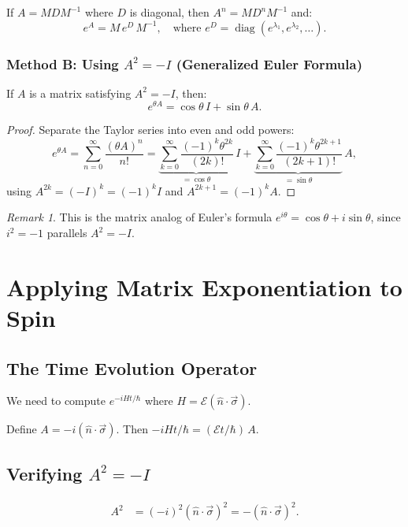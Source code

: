 \documentclass[11pt,a4paper]{article}
\theoremstyle{definition}
\theoremstyle{plain}
\theoremstyle{remark}
\newtheorem{remark}{Remark}[section]
\begin{document}
If $A = M D M^{-1}$ where $D$ is diagonal, then $A^n = MD^nM^{-1}$ and:
\[
    e^A = M\,e^D\,M^{-1}, \quad \text{where } e^D = \operatorname{diag}(e^{\lambda_1}, e^{\lambda_2}, \ldots).
\]

\subsubsection{Method B: Using $A^2 = -I$ (Generalized Euler Formula)}

If $A$ is a matrix satisfying $A^2 = -I$, then:
\[
    \boxed{e^{\theta A} = \cos\theta\, I + \sin\theta\, A.}
\]

\begin{proof}
    Separate the Taylor series into even and odd powers:
    \[
        e^{\theta A} = \sum_{n=0}^{\infty}\frac{(\theta A)^n}{n!} = \underbrace{\sum_{k=0}^{\infty}\frac{(-1)^k\theta^{2k}}{(2k)!}}_{=\cos\theta}\,I + \underbrace{\sum_{k=0}^{\infty}\frac{(-1)^k\theta^{2k+1}}{(2k+1)!}}_{=\sin\theta}\,A,
    \]
    using $A^{2k} = (-I)^k = (-1)^kI$ and $A^{2k+1} = (-1)^kA$. \qedhere
\end{proof}

\begin{remark}
    This is the matrix analog of Euler's formula $e^{i\theta} = \cos\theta + i\sin\theta$, since $i^2 = -1$ parallels $A^2 = -I$.
\end{remark}

\section{Applying Matrix Exponentiation to Spin}

\subsection{The Time Evolution Operator}

We need to compute $e^{-iHt/\hbar}$ where $H = \mathcal{E}(\hat{n}\cdot\vec{\sigma})$.

Define $A = -i(\hat{n}\cdot\vec{\sigma})$. Then $-iHt/\hbar = (\mathcal{E}t/\hbar)\,A$.

\subsection{Verifying $A^2 = -I$}

\begin{align}
    A^2 &= (-i)^2(\hat{n}\cdot\vec{\sigma})^2 = -(\hat{n}\cdot\vec{\sigma})^2.
\end{align}
\end{document}
